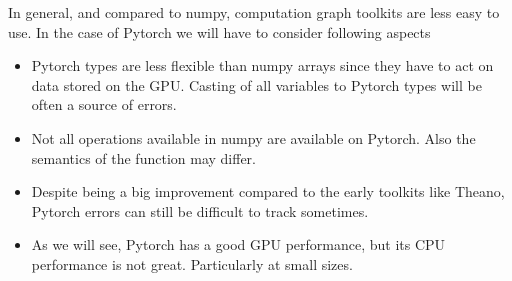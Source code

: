 In general, and compared to numpy, computation graph toolkits are less easy to use.
In the case of Pytorch we will have to consider following aspects 

\begin{itemize}
\item Pytorch types are less flexible than numpy arrays since they have to act on data stored on the GPU. Casting of all variables to Pytorch types will be often a source of errors.
\item Not all operations available in numpy are available on Pytorch. Also the semantics of the function may differ.
\item Despite being a big improvement compared to the early toolkits like Theano, Pytorch errors can still be difficult to track sometimes.
\item As we will see, Pytorch has a good GPU performance, but its CPU performance is not great. Particularly at small sizes. 
\end{itemize}




